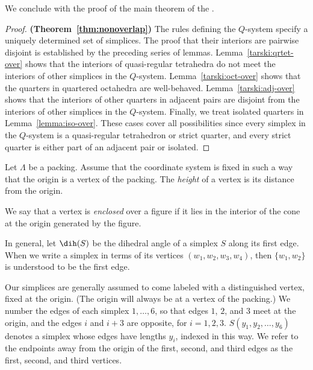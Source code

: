 
We conclude with the proof of the main theorem of the \chap.

\begin{proof} {\bf (Theorem~\ref{thm:nonoverlap})}
The rules defining the $Q$-system specify a uniquely determined
set of simplices.  The proof that their interiors are pairwise
disjoint is established by the preceding series of lemmas.
Lemma~\ref{tarski:qrtet-over} shows that the interiors of
quasi-regular tetrahedra do not meet the interiors of other
simplices in the $Q$-system. Lemma~\ref{tarski:oct-over} shows that
the quarters in quartered octahedra are well-behaved.
Lemma~\ref{tarski:adj-over} shows that the interiors of other
quarters in adjacent pairs are disjoint from the interiors of
other simplices in the $Q$-system. Finally, we treat isolated
quarters in Lemma~\ref{lemma:iso-over}. These cases cover all
possibilities since every simplex in the $Q$-system is a
quasi-regular tetrahedron or strict quarter, and every strict
quarter is either part of an adjacent pair or isolated.
\end{proof}


\begin{definition} \label{def:height}  Let $\Lambda$ be a
packing.  Assume that the coordinate system is fixed in
such a way that the origin is a vertex of the packing.  The {\it
height\/} of a vertex is its distance from the origin.
%
\end{definition}

\begin{definition} \label{def:enclosed}
We say that a vertex is {\it enclosed\/} over a figure if it lies
in the interior of the cone at the origin generated by the figure.
%
\end{definition}

\begin{definition}\label{def:dih}
In general, let $\dih(S)$ be the dihedral angle of a simplex $S$
along its first edge. When we write a simplex in terms of its
vertices $(w_1,w_2,w_3,w_4)$, then $\{w_1,w_2\}$ is understood to
be the first edge.
%
\end{definition}


Our simplices are generally assumed to come labeled with a
distinguished vertex, fixed  at the origin. (The origin will
always be at a vertex of the packing.) We number the edges of each
simplex $1,\ldots,6$, so that edges $1$, $2$, and $3$ meet at the
origin, and the edges $i$ and $i+3$ are opposite, for $i=1,2,3$.
$S(y_1,y_2,\ldots,y_6)$ denotes a simplex whose edges have lengths
$y_i$, indexed in this way. We refer to the endpoints away from
the origin of the first, second, and third edges as the first,
second, and third vertices.
%



